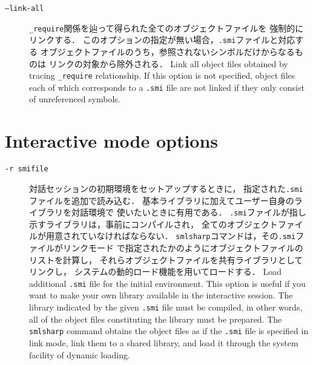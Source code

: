 \documentclass{jbook}
\newcommand{\txt}[2]{#2}
\newcommand{\term}[1]{\mbox{{\tt #1}}}
\begin{document}
\begin{description}
\ifjp%
\item[{\tt --link-all}]
	{\tt \_require}関係を辿って得られた全てのオブジェクトファイルを
強制的にリンクする．
	このオプションの指定が無い場合，{\tt .smi}ファイルと対応する
オブジェクトファイルのうち，参照されないシンボルだけからなるものは
リンクの対象から除外される．
\else%
	Link all object files obtained by tracing {\tt \_require} relationship.
	If this option is not specified,
object files each of which corresponds to a {\tt .smi} file are not linked
if they only consist of unreferenced symbols.
\fi%

\end{description}

\section{\txt{対話モードのオプション}{Interactive mode options}}

\begin{description}

\item[{\tt -r \term{smifile}}]
\ifjp%
	対話セッションの初期環境をセットアップするときに，
指定された{\tt .smi}ファイルを追加で読み込む．
	基本ライブラリに加えてユーザー自身のライブラリを対話環境で
使いたいときに有用である．
	{\tt .smi}ファイルが指し示すライブラリは，事前にコンパイルされ，
全てのオブジェクトファイルが用意されていなければならない．
	{\tt smlsharp}コマンドは，その{\tt .smi}ファイルがリンクモード
で指定されたかのようにオブジェクトファイルのリストを計算し，
それらオブジェクトファイルを共有ライブラリとしてリンクし，
システムの動的ロード機能を用いてロードする．
\else%
	Load additional {\tt .smi} file for the initial environment.
	This option is useful if you want to make your own library
available in the interactive session.
	The library indicated by the given {\tt .smi} file must be
compiled, in other words, all of the object files constituting the
library must be prepared.
	The {\tt smlsharp} command obtains the object files as if
the {\tt .smi} file is specified in link mode, link them to a shared
library, and load it through the system facility of dynamic loading.
\fi%

\end{description}
\end{document}
